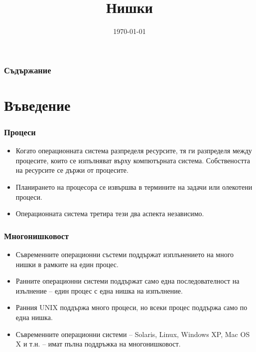 \documentclass[ignorenonframetext, hyperref=unicode]{beamer}
\title{Нишки}
\date{\today}
\begin{document}
\frame{\maketitle}

\begin{frame}
\frametitle{Съдържание}
\tableofcontents %
\end{frame}

\section{Въведение}


\begin{frame}\frametitle{Процеси}
\begin{itemize}
\item Когато операционната система разпределя ресурсите, тя ги разпределя между
процесите, които се изпълняват върху компютърната система. Собствеността на
ресурсите се държи от процесите.
\item Планирането на процесора се извършва в термините на задачи или олекотени
процеси.
\item Операционната система третира тези два аспекта независимо.
\end{itemize}
\end{frame}

\begin{frame}\frametitle{Многонишковост}
\begin{itemize}
\item Съвременните операционни състеми поддържат изплънението на много нишки в
рамките на един процес.
\item Ранните операционни системи поддържат само една последователност на
изълнение -- един процес с една нишка на изпълнение.
\item Ранния UNIX поддържа много процеси, но всеки процес поддържа само по една
нишка.
\item Съвременните операционни системи -- Solaris, Linux, Windows XP, Mac OS X и
т.н. -- имат пълна поддръжка на многонишковост.
\end{itemize}
\end{frame}
\end{document}
